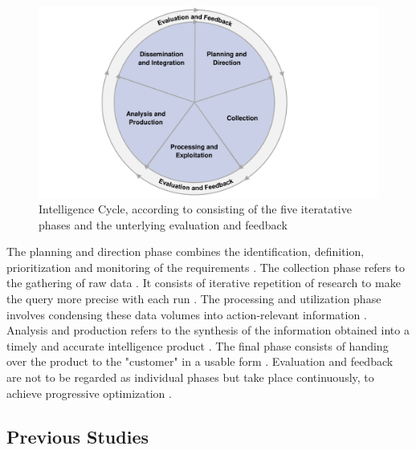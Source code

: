 \documentclass[10pt]{article}
\begin{document}
\begin{figure}[h]
    \centering
    \includegraphics[clip,width=0.8\linewidth]{PDF/images/crop_Intelligence Cycle}
    \caption{Intelligence Cycle, according to \cite{JointChiefsofStaffU.S.Army.2013} consisting of the five iteratative phases and the unterlying evaluation and feedback}
    \label{fig: intelligence cycle}
\end{figure}

The planning and direction phase combines the identification, definition, prioritization and monitoring
of the requirements \cite{JointChiefsofStaffU.S.Army.2013}.
The collection phase refers to the gathering of raw data \cite{CentralIntelligenceAgency.1987}.
It consists of iterative repetition of research
\cite{NorthAtlanticTreatyOrganization.2001} to make the query more precise with each run
\cite{PastorGalindo.2020}. The processing and utilization phase involves condensing
these data volumes into action-relevant information
\cite{JointChiefsofStaffU.S.Army.2013}.
Analysis and production refers to the synthesis of the information obtained into a timely and accurate intelligence product
\cite{Hwang.2022, NorthAtlanticTreatyOrganization.2001}.
The final phase consists of handing over the product to the "customer" in a
usable form \cite{CentralIntelligenceAgency.2023, Williams.2018}.
Evaluation and feedback are not to be regarded as individual phases
but take place continuously, to achieve progressive optimization
\cite{JointChiefsofStaffU.S.Army.2013, NorthAtlanticTreatyOrganization.2001}.

\subsection{Previous Studies}
\end{document}
